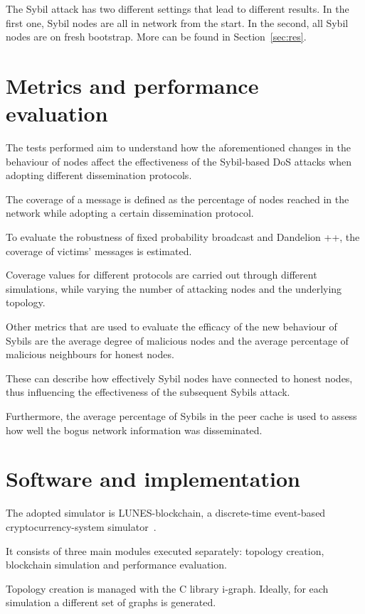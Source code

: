 The Sybil attack has two different settings that lead to different results. In the first one, Sybil nodes are all in network from the start.  In the second, all Sybil nodes are on fresh bootstrap. More can be found in Section~\ref{sec:res}.

\section{Metrics and performance evaluation}\label{sec:metrics}
The tests performed aim to understand how the aforementioned changes in the behaviour of nodes affect the effectiveness of the Sybil-based DoS attacks when adopting different dissemination protocols.

The coverage of a message is defined as the percentage of nodes reached in the network while adopting a certain dissemination protocol.

To evaluate the robustness of fixed probability broadcast and Dandelion ++, the coverage of victims' messages is estimated.

Coverage values for different protocols are carried out through different simulations, while varying the number of attacking nodes and the underlying topology.\par

Other metrics that are used to evaluate the efficacy of the new behaviour of Sybils are the average degree of malicious nodes and the average percentage of malicious neighbours for honest nodes.

These can describe how effectively Sybil nodes have connected to honest nodes, thus influencing the effectiveness of the subsequent Sybils attack.

Furthermore, the average percentage of Sybils in the peer cache is used to assess how well the bogus network information was disseminated.

\section{Software and implementation}\label{sec:softw}
The adopted simulator is LUNES-blockchain, a discrete-time event-based cryptocurrency-system simulator~\cite{lunes-paper}.

It consists of three main modules executed separately: topology creation, blockchain simulation and performance evaluation.

Topology creation is managed with the C library i-graph. Ideally, for each simulation a different set of graphs is generated.

